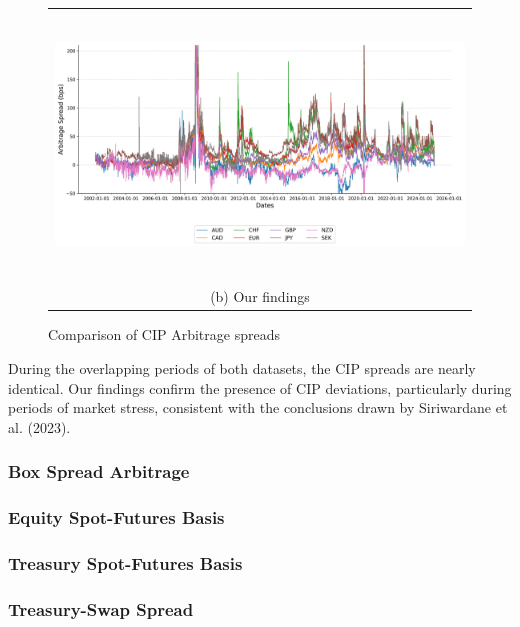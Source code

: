 \documentclass{article}
\begin{document}
\begin{appendices}
\begin{figure}
  \vspace{\floatsep}

  \begin{tabular}{@{}c@{}}
    \includegraphics[width=.7\linewidth,height=200pt,width=400pt]{../docs_src/CIP_replicate.png} \\[\abovecaptionskip]
    \small (b) Our findings
  \end{tabular}

  \caption{Comparison of CIP Arbitrage spreads}
  \label{fig:cip_comparison}
\end{figure}

\FloatBarrier


During the overlapping periods of both datasets, the CIP spreads are nearly identical.
Our findings confirm the presence of CIP deviations, particularly during periods of
market stress, consistent with the conclusions drawn by Siriwardane et al. (2023).


\subsubsection{Box Spread Arbitrage}

\subsubsection{Equity Spot-Futures Basis}

\subsubsection{Treasury Spot-Futures Basis}

\subsubsection{Treasury-Swap Spread}


\end{appendices}
\end{document}
